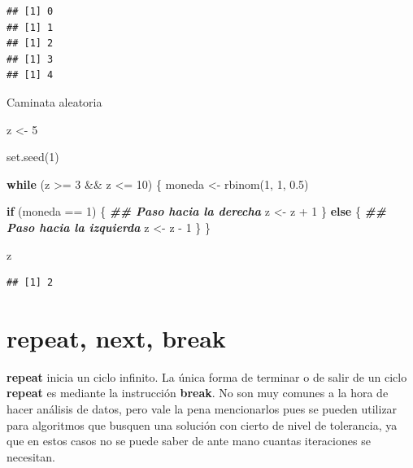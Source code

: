 \documentclass[
  12pt,
]{book}
\newenvironment{Shaded}{\begin{snugshade}}{\end{snugshade}}
\newcommand{\ControlFlowTok}[1]{\textcolor[rgb]{0.13,0.29,0.53}{\textbf{#1}}}
\newcommand{\DecValTok}[1]{\textcolor[rgb]{0.00,0.00,0.81}{#1}}
\newcommand{\DocumentationTok}[1]{\textcolor[rgb]{0.56,0.35,0.01}{\textbf{\textit{#1}}}}
\newcommand{\FloatTok}[1]{\textcolor[rgb]{0.00,0.00,0.81}{#1}}
\newcommand{\FunctionTok}[1]{\textcolor[rgb]{0.00,0.00,0.00}{#1}}
\newcommand{\NormalTok}[1]{#1}
\newcommand{\OtherTok}[1]{\textcolor[rgb]{0.56,0.35,0.01}{#1}}
\newcommand{\SpecialCharTok}[1]{\textcolor[rgb]{0.00,0.00,0.00}{#1}}
\begin{document}
\begin{verbatim}
## [1] 0
## [1] 1
## [1] 2
## [1] 3
## [1] 4
\end{verbatim}

Caminata aleatoria

\begin{Shaded}
\begin{Highlighting}[]
\NormalTok{z }\OtherTok{\textless{}{-}} \DecValTok{5}

\FunctionTok{set.seed}\NormalTok{(}\DecValTok{1}\NormalTok{)}

\ControlFlowTok{while}\NormalTok{ (z }\SpecialCharTok{\textgreater{}=} \DecValTok{3} \SpecialCharTok{\&\&}\NormalTok{ z }\SpecialCharTok{\textless{}=} \DecValTok{10}\NormalTok{) \{}
\NormalTok{  moneda }\OtherTok{\textless{}{-}} \FunctionTok{rbinom}\NormalTok{(}\DecValTok{1}\NormalTok{, }\DecValTok{1}\NormalTok{, }\FloatTok{0.5}\NormalTok{)}

  \ControlFlowTok{if}\NormalTok{ (moneda }\SpecialCharTok{==} \DecValTok{1}\NormalTok{) \{ }\DocumentationTok{\#\# Paso hacia la derecha}
\NormalTok{    z }\OtherTok{\textless{}{-}}\NormalTok{ z }\SpecialCharTok{+} \DecValTok{1}
\NormalTok{  \} }\ControlFlowTok{else}\NormalTok{ \{          }\DocumentationTok{\#\# Paso hacia la izquierda}
\NormalTok{    z }\OtherTok{\textless{}{-}}\NormalTok{ z }\SpecialCharTok{{-}} \DecValTok{1}
\NormalTok{  \}}
\NormalTok{\}}

\NormalTok{z}
\end{Highlighting}
\end{Shaded}

\begin{verbatim}
## [1] 2
\end{verbatim}

\hypertarget{repeat-next-break}{%
\section{\texorpdfstring{\textbf{repeat, next, break}}{repeat, next, break}}\label{repeat-next-break}}

\textbf{repeat} inicia un ciclo infinito. La única forma de terminar o de salir de un ciclo \textbf{repeat} es mediante la instrucción \textbf{break}. No son muy comunes a la hora de hacer análisis de datos, pero vale la pena mencionarlos pues se pueden utilizar para algoritmos que busquen una solución con cierto de nivel de tolerancia, ya que en estos casos no se puede saber de ante mano cuantas iteraciones se necesitan.
\end{document}
